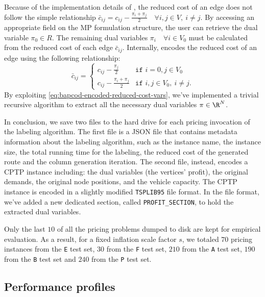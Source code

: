 Because of the implementation details of \bapcod{},
the reduced cost of an edge does not follow the simple relationship
$\bar{c}_{ij} = c_{ij} - \frac{\pi_i + \pi_j}{2} \quad \forall i, j \in V,\ i \ne j$.
By accessing an appropriate field on the MP formulation structure,
the user can retrieve the dual variable $\pi_0 \in R$.
The remaining dual variables $\pi_i \quad \forall i \in V_0$
must be calculated from the reduced cost of each edge $\bar{c}_{ij}$.
Internally, \bapcod{} encodes the reduced cost of an edge using the following relationship:
\begin{equation}
	\bar{c}_{ij} = \begin{cases}
		c_{ij} - \frac{\pi_{j}}{2}       & \texttt{if } i = 0, j \in V_0        \\
		c_{ij} - \frac{\pi_i + \pi_j}{2} & \texttt{if } i, j \in V_0,\ i \ne j.
	\end{cases}
	\label{eq:bapcod-encoded-reduced-cost-vars}
\end{equation}
By exploiting \cref{eq:bapcod-encoded-reduced-cost-vars},
we've implemented a trivial recursive algorithm
to extract all the necessary dual variables $\pi \in \R^N$.

In conclusion, we save two files to the hard drive for each pricing invocation of the labeling algorithm.
The first file is a JSON file that contains metadata information about
the labeling algorithm, such as the instance name, the instance size,
the total running time for the labeling, the reduced cost of the generated route
and the column generation iteration.
The second file, instead, encodes a CPTP instance including:
the dual variables (the vertices' profit),
the original demands, the original node positions, and the vehicle capacity.
The CPTP instance is encoded in a slightly modified \texttt{TSPLIB95} file format.
In the file format, we've added a new dedicated section, called \texttt{PROFIT\_SECTION},
to hold the extracted dual variables.

Only the last $10$ of all the pricing problems dumped to disk are kept for empirical evaluation.
As a result, for a fixed inflation scale factor $s$,
we totaled $70$ pricing instances from the \texttt{E} test set,
$30$ from the \texttt{F} test set,
$210$ from the \texttt{A} test set,
$190$ from the \texttt{B} test set
and $240$ from the \texttt{P} test set.

\subsection{Performance profiles}
\label{sec:results-performance-profiles}

